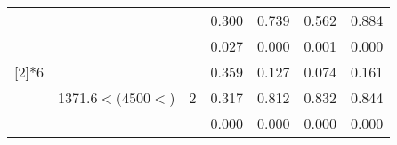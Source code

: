\begin{table}[htbp]
\begin{tabular}{ccccccc}
          &       &       & 0.300  & 0.739  & 0.562  & 0.884  \\
          &       &       & 0.027  & 0.000  & 0.001  & 0.000  \bigstrut\\\cline{4-7}\noalign{\smallskip}
    \multirow{3}[2]{*}{6} & \multirow{3}[2]{2.5cm}{1371.6$< (4500<$)} & \multirow{3}[2]{*}{2} & 0.359  & 0.127  & 0.074  & 0.161  \\
          &       &       & 0.317  & 0.812  & 0.832  & 0.844  \\
          &       &       & 0.000  & 0.000  & 0.000  & 0.000  \\
    \bottomrule
    \end{tabular}%
  \label{tab:Set2SWJDl}%
\end{table}%
